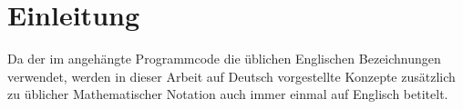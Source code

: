 \chapter{Einleitung}
\label{chap:ein}

Da der im angehängte Programmcode die üblichen Englischen Bezeichnungen verwendet, werden in dieser Arbeit auf Deutsch vorgestellte Konzepte zusätzlich zu üblicher Mathematischer Notation auch immer einmal auf Englisch betitelt.



